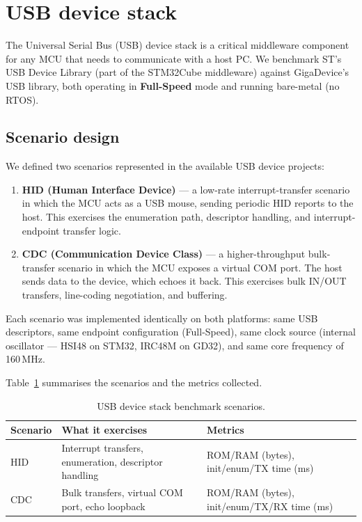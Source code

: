 \section{USB device stack}
\label{sec:gd32-usb}

The Universal Serial Bus (USB) device stack is a critical middleware component for any MCU
that needs to communicate with a host PC. We benchmark ST's USB Device Library (part of the
STM32Cube middleware) against GigaDevice's USB library, both operating in
\textbf{Full-Speed} mode and running bare-metal (no RTOS).

\subsection{Scenario design}
\label{sec:gd32-usb-scenarios}

We defined two scenarios represented in the available USB device projects:

\begin{enumerate}
  \item \textbf{HID (Human Interface Device)} --- a low-rate interrupt-transfer scenario in
    which the MCU acts as a USB mouse, sending periodic HID reports to the host. This
    exercises the enumeration path, descriptor handling, and interrupt-endpoint transfer
    logic.
  \item \textbf{CDC (Communication Device Class)} --- a higher-throughput bulk-transfer
    scenario in which the MCU exposes a virtual COM port. The host sends data to the
    device, which echoes it back. This exercises bulk IN/OUT transfers, line-coding
    negotiation, and buffering.
\end{enumerate}

Each scenario was implemented identically on both platforms: same USB descriptors, same
endpoint configuration (Full-Speed), same clock source (internal oscillator ---
HSI48 on STM32, IRC48M on GD32), and same core frequency of 160\,MHz.

Table~\ref{tab:gd32-usb-scenarios} summarises the scenarios and the metrics collected.

\begin{table}[H]
  \centering
  \caption{USB device stack benchmark scenarios.}
  \label{tab:gd32-usb-scenarios}
  \begin{tabularx}{\textwidth}{l X l}
    \toprule
    \textbf{Scenario} & \textbf{What it exercises} & \textbf{Metrics} \\
    \midrule
    HID  & Interrupt transfers, enumeration, descriptor handling
         & ROM/RAM (bytes), init/enum/TX time (ms) \\
    CDC  & Bulk transfers, virtual COM port, echo loopback
         & ROM/RAM (bytes), init/enum/TX/RX time (ms) \\
    \bottomrule
  \end{tabularx}
\end{table}

